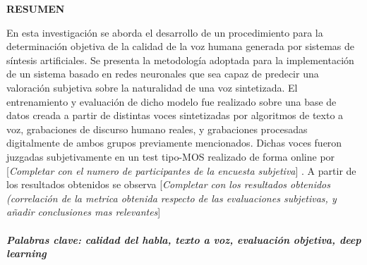 \begin{center}
    \textbf{\LARGE{RESUMEN}}
\end{center}

En esta investigación se aborda el desarrollo de un procedimiento para la determinación objetiva de la calidad de la voz humana generada por sistemas de síntesis artificiales. Se presenta la metodología adoptada para la implementación de un sistema basado en redes neuronales que sea capaz de predecir una valoración subjetiva sobre la naturalidad de una voz sintetizada. El entrenamiento y evaluación de dicho modelo fue realizado sobre una base de datos creada a partir de distintas voces sintetizadas por  algoritmos de texto a voz, grabaciones de discurso humano reales, y grabaciones procesadas digitalmente de ambos grupos previamente mencionados. Dichas voces fueron juzgadas subjetivamente en un test tipo-MOS realizado de forma online por \color{red} [\textit{Completar con el numero de participantes de la encuesta subjetiva}] \color{black}. A partir de los resultados obtenidos se observa \color{red} [\textit{Completar con los resultados obtenidos (correlación de la metrica obtenida respecto de las evaluaciones subjetivas, y añadir conclusiones mas relevantes}] \color{black}
\\
\\
\footnotesize
\textbf{\textit{Palabras clave: calidad del habla, texto a voz, evaluación objetiva, deep learning }}
\normalsize

\newpage